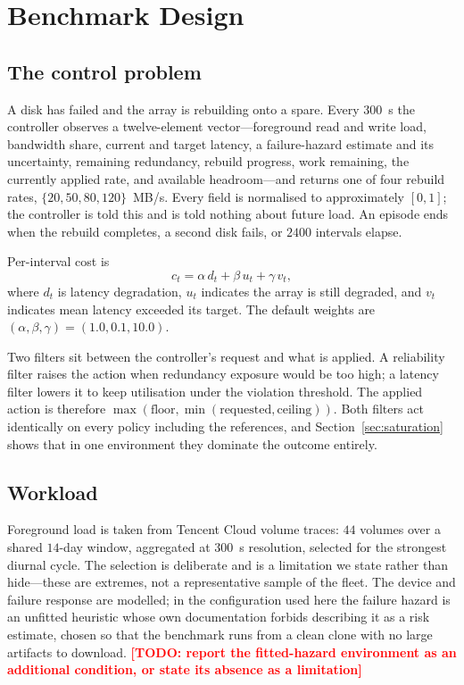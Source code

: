 \documentclass[conference]{IEEEtran}
\newcommand{\TODO}[1]{\textcolor{red}{\textbf{[TODO: #1]}}}
\begin{document}
\section{Benchmark Design}

\subsection{The control problem}

A disk has failed and the array is rebuilding onto a spare. Every $300$~s the controller
observes a twelve-element vector---foreground read and write load, bandwidth share,
current and target latency, a failure-hazard estimate and its uncertainty, remaining
redundancy, rebuild progress, work remaining, the currently applied rate, and available
headroom---and returns one of four rebuild rates, $\{20, 50, 80, 120\}$~MB/s. Every field
is normalised to approximately $[0,1]$; the controller is told this and is told nothing
about future load. An episode ends when the rebuild completes, a second disk fails, or
$2400$ intervals elapse.

Per-interval cost is
\begin{equation}
c_t = \alpha \, d_t + \beta \, u_t + \gamma \, v_t ,
\end{equation}
where $d_t$ is latency degradation, $u_t$ indicates the array is still degraded, and $v_t$
indicates mean latency exceeded its target. The default weights are
$(\alpha,\beta,\gamma) = (1.0, 0.1, 10.0)$.

Two filters sit between the controller's request and what is applied. A reliability filter
raises the action when redundancy exposure would be too high; a latency filter lowers it
to keep utilisation under the violation threshold. The applied action is therefore
$\max(\text{floor}, \min(\text{requested}, \text{ceiling}))$. Both filters act identically
on every policy including the references, and Section~\ref{sec:saturation} shows that in
one environment they dominate the outcome entirely.

\subsection{Workload}

Foreground load is taken from Tencent Cloud volume traces: $44$ volumes over a shared
$14$-day window, aggregated at $300$~s resolution, selected for the strongest diurnal
cycle. The selection is deliberate and is a limitation we state rather than hide---these
are extremes, not a representative sample of the fleet. The device and failure response
are modelled; in the configuration used here the failure hazard is an unfitted heuristic
whose own documentation forbids describing it as a risk estimate, chosen so that the
benchmark runs from a clean clone with no large artifacts to download.
\TODO{report the fitted-hazard environment as an additional condition, or state its
absence as a limitation}
\end{document}
